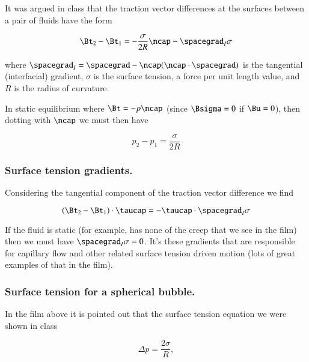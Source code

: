 It was argued in class that the traction vector differences at the surfaces between a pair of fluids have the form

\begin{equation}\label{eqn:continuumFluidsReview:2090}
\Bt_2 - \Bt_1 = -\frac{\sigma}{2 R} \ncap - \spacegrad_I \sigma
\end{equation}

where $\spacegrad_I = \spacegrad - \ncap (\ncap \cdot \spacegrad)$ is the tangential (interfacial) gradient, $\sigma$ is the surface tension, a force per unit length value, and $R$ is the radius of curvature.

In static equilibrium where $\Bt = -p \ncap$ (since $\Bsigma = 0$ if $\Bu = 0$), then dotting with $\ncap$ we must then have

\begin{equation}\label{eqn:continuumFluidsReview:2110}
p_2 - p_1 = \frac{\sigma}{2 R} 
\end{equation}

\subsubsection{Surface tension gradients.}

Considering the tangential component of the traction vector difference we find

\begin{equation}\label{eqn:continuumFluidsReview:2130}
(\Bt_2 - \Bt_1) \cdot \taucap = - \taucap \cdot \spacegrad_I \sigma
\end{equation}

If the fluid is static (for example, has none of the creep that we see in the film) then we must have $\spacegrad_I \sigma = 0$.  It's these gradients that are responsible for capillary flow and other related surface tension driven motion (lots of great examples of that in the film).

\subsubsection{Surface tension for a spherical bubble.}

In the film above it is pointed out that the surface tension equation we were shown in class

\begin{equation}\label{eqn:continuumFluidsReview:1490}
\Delta p = \frac{2 \sigma}{R},
\end{equation}

